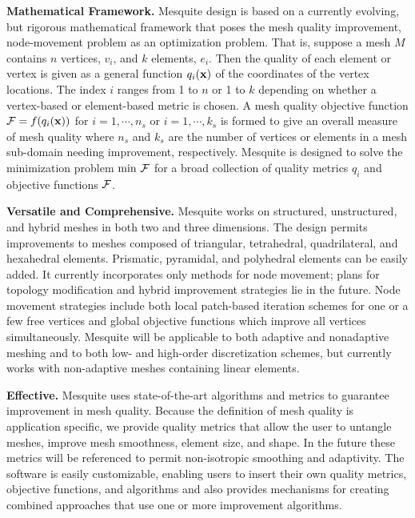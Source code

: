 \documentclass[psfig]{article}
\begin{document}
{\bf Mathematical Framework.}  Mesquite design is based on a currently
evolving, but rigorous mathematical framework that poses the mesh
quality improvement, node-movement problem as an optimization problem.
That is, suppose a mesh $M$ contains $n$ vertices, $v_i$, and $k$
elements, $e_i$.  Then the quality of each element or vertex is given
as a general function $q_i ( {\bf x} )$ of the coordinates of the
vertex locations.  The index $i$ ranges from 1 to $n$ or 1 to $k$
depending on whether a vertex-based or element-based metric is chosen.
A mesh quality objective function ${\cal F} = f(q_i({\bf x} ))$ for
$i=1,\cdots,n_s$ or $i=1,\cdots,k_s$ is formed to give an overall
measure of mesh quality where $n_s$ and $k_s$ are the number of
vertices or elements in a mesh sub-domain needing improvement,
respectively.  Mesquite is designed to solve the minimization problem
${\rm min}~{\cal F}$ for a broad collection of quality metrics $q_i$
and objective functions ${\cal F}$.

{\bf Versatile and Comprehensive.}  Mesquite works on structured,
unstructured, and hybrid meshes in both two and three dimensions. The
design permits improvements to meshes composed of triangular,
tetrahedral, quadrilateral, and hexahedral elements. Prismatic,
pyramidal, and polyhedral elements can be easily added.  
It currently incorporates only methods for node movement; plans for 
topology modification and hybrid improvement strategies lie in the future.
Node movement strategies include both local patch-based iteration
schemes for one or a few free vertices and global objective functions
which improve all vertices simultaneously.  Mesquite will be
applicable to both adaptive and nonadaptive meshing and to both low-
and high-order discretization schemes, but currently works with
non-adaptive meshes containing linear elements.

{\bf Effective.}  Mesquite uses state-of-the-art algorithms and
metrics to guarantee improvement in mesh quality.  Because the
definition of mesh quality is application specific, we provide quality
metrics that allow the user to untangle meshes, improve mesh
smoothness, element size, and shape. In the future these metrics will
be referenced to permit non-isotropic smoothing and adaptivity. The
software is easily customizable, enabling users to insert their own
quality metrics, objective functions, and algorithms and also provides
mechanisms for creating combined approaches that use one or more
improvement algorithms.
\end{document}
